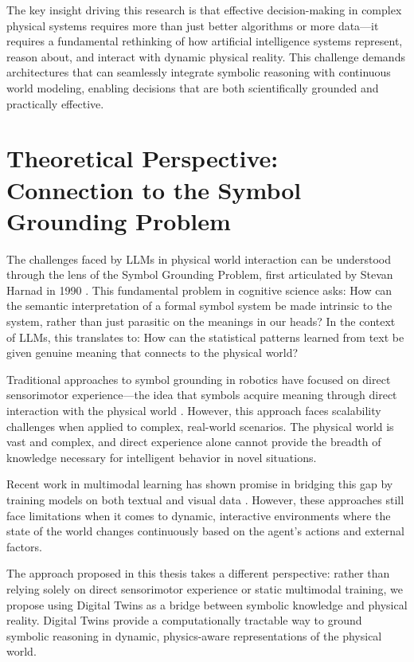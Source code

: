 The key insight driving this research is that effective decision-making in complex physical systems requires more than just better algorithms or more data—it requires a fundamental rethinking of how artificial intelligence systems represent, reason about, and interact with dynamic physical reality. This challenge demands architectures that can seamlessly integrate symbolic reasoning with continuous world modeling, enabling decisions that are both scientifically grounded and practically effective.

\section{Theoretical Perspective: Connection to the Symbol Grounding Problem}

The challenges faced by LLMs in physical world interaction can be understood through the lens of the Symbol Grounding Problem, first articulated by Stevan Harnad in 1990 \cite{harnad1990symbol}. This fundamental problem in cognitive science asks: How can the semantic interpretation of a formal symbol system be made intrinsic to the system, rather than just parasitic on the meanings in our heads? In the context of LLMs, this translates to: How can the statistical patterns learned from text be given genuine meaning that connects to the physical world?

Traditional approaches to symbol grounding in robotics have focused on direct sensorimotor experience—the idea that symbols acquire meaning through direct interaction with the physical world \cite{cangelosi2010integration}. However, this approach faces scalability challenges when applied to complex, real-world scenarios. The physical world is vast and complex, and direct experience alone cannot provide the breadth of knowledge necessary for intelligent behavior in novel situations.

Recent work in multimodal learning has shown promise in bridging this gap by training models on both textual and visual data \cite{radford2021learning, alayrac2022flamingo}. However, these approaches still face limitations when it comes to dynamic, interactive environments where the state of the world changes continuously based on the agent's actions and external factors.

The approach proposed in this thesis takes a different perspective: rather than relying solely on direct sensorimotor experience or static multimodal training, we propose using Digital Twins as a bridge between symbolic knowledge and physical reality. Digital Twins provide a computationally tractable way to ground symbolic reasoning in dynamic, physics-aware representations of the physical world.

